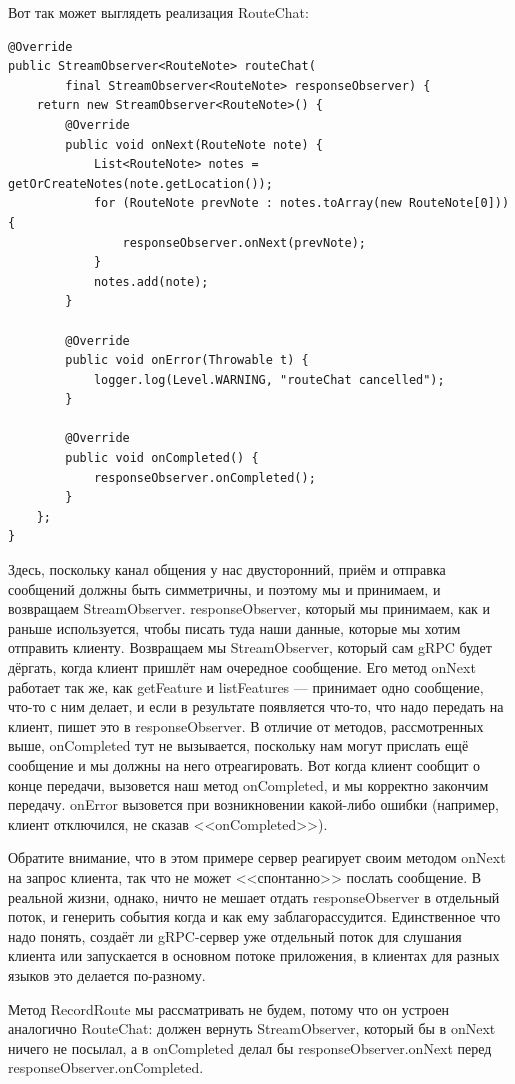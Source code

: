 \documentclass{../../text-style}
\begin{document}
Вот так может выглядеть реализация RouteChat:

\begin{verbatim}
@Override
public StreamObserver<RouteNote> routeChat(
        final StreamObserver<RouteNote> responseObserver) {
    return new StreamObserver<RouteNote>() {
        @Override
        public void onNext(RouteNote note) {
            List<RouteNote> notes = getOrCreateNotes(note.getLocation());
            for (RouteNote prevNote : notes.toArray(new RouteNote[0])) {
                responseObserver.onNext(prevNote);
            }
            notes.add(note);
        }

        @Override
        public void onError(Throwable t) {
            logger.log(Level.WARNING, "routeChat cancelled");
        }

        @Override
        public void onCompleted() {
            responseObserver.onCompleted();
        }
    };
}
\end{verbatim}

Здесь, поскольку канал общения у нас двусторонний, приём и отправка сообщений должны быть симметричны, и поэтому мы и принимаем, и возвращаем StreamObserver. responseObserver, который мы принимаем, как и раньше используется, чтобы писать туда наши данные, которые мы хотим отправить клиенту. Возвращаем мы StreamObserver, который сам gRPC будет дёргать, когда клиент пришлёт нам очередное сообщение. Его метод onNext работает так же, как getFeature и listFeatures --- принимает одно сообщение, что-то с ним делает, и если в результате появляется что-то, что надо передать на клиент, пишет это в responseObserver. В отличие от методов, рассмотренных выше, onCompleted тут не вызывается, поскольку нам могут прислать ещё сообщение и мы должны на него отреагировать. Вот когда клиент сообщит о конце передачи, вызовется наш метод onCompleted, и мы корректно закончим передачу. onError вызовется при возникновении какой-либо ошибки (например, клиент отключился, не сказав <<onCompleted>>).

Обратите внимание, что в этом примере сервер реагирует своим методом onNext на запрос клиента, так что не может <<спонтанно>> послать сообщение. В реальной жизни, однако, ничто не мешает отдать responseObserver в отдельный поток, и генерить события когда и как ему заблагорассудится. Единственное что надо понять, создаёт ли gRPC-сервер уже отдельный поток для слушания клиента или запускается в основном потоке приложения, в клиентах для разных языков это делается по-разному.

Метод RecordRoute мы рассматривать не будем, потому что он устроен аналогично RouteChat: должен вернуть StreamObserver, который бы в onNext ничего не посылал, а в onCompleted делал бы responseObserver.onNext перед responseObserver.onCompleted.
\end{document}
